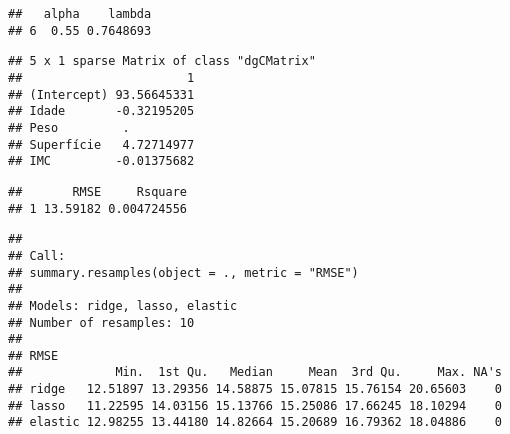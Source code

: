 \documentclass[]{article}
\newenvironment{Shaded}{\begin{snugshade}}{\end{snugshade}}
\newcommand{\CommentTok}[1]{\textcolor[rgb]{0.56,0.35,0.01}{\textit{#1}}}
\newcommand{\DataTypeTok}[1]{\textcolor[rgb]{0.13,0.29,0.53}{#1}}
\newcommand{\KeywordTok}[1]{\textcolor[rgb]{0.13,0.29,0.53}{\textbf{#1}}}
\newcommand{\NormalTok}[1]{#1}
\newcommand{\OperatorTok}[1]{\textcolor[rgb]{0.81,0.36,0.00}{\textbf{#1}}}
\newcommand{\StringTok}[1]{\textcolor[rgb]{0.31,0.60,0.02}{#1}}
\begin{document}
\begin{verbatim}
##   alpha    lambda
## 6  0.55 0.7648693
\end{verbatim}

\begin{Shaded}
\end{Shaded}

\begin{verbatim}
## 5 x 1 sparse Matrix of class "dgCMatrix"
##                       1
## (Intercept) 93.56645331
## Idade       -0.32195205
## Peso         .         
## Superfície   4.72714977
## IMC         -0.01375682
\end{verbatim}

\begin{Shaded}
\end{Shaded}

\begin{verbatim}
##       RMSE     Rsquare
## 1 13.59182 0.004724556
\end{verbatim}

\begin{Shaded}
\end{Shaded}

\begin{verbatim}
## 
## Call:
## summary.resamples(object = ., metric = "RMSE")
## 
## Models: ridge, lasso, elastic 
## Number of resamples: 10 
## 
## RMSE 
##             Min.  1st Qu.   Median     Mean  3rd Qu.     Max. NA's
## ridge   12.51897 13.29356 14.58875 15.07815 15.76154 20.65603    0
## lasso   11.22595 14.03156 15.13766 15.25086 17.66245 18.10294    0
## elastic 12.98255 13.44180 14.82664 15.20689 16.79362 18.04886    0
\end{verbatim}
\end{document}
